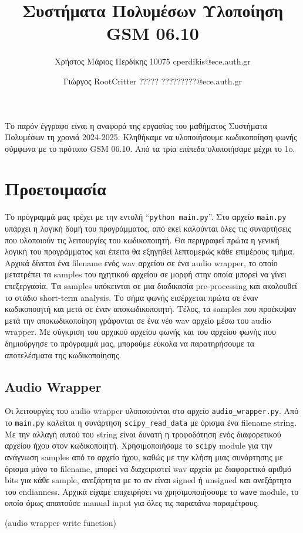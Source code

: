 \documentclass{article}
\title{Συστήματα Πολυμέσων Υλοποίηση GSM 06.10}
\author{Χρήστος Μάριος Περδίκης 10075 cperdikis@ece.auth.gr 
\and Γιώργος RootCritter ?????  ?????????@ece.auth.gr}
\date{}
\begin{document}
 \maketitle Το παρόν έγγραφο είναι η αναφορά της
εργασίας του μαθήματος Συστήματα Πολυμέσων τη χρονιά 2024-2025.
Κληθήκαμε να υλοποιήσουμε κωδικοποίηση φωνής σύμφωνα με το πρότυπο GSM
06.10. Από τα τρία επίπεδα υλοποιήσαμε μέχρι το 1o.

\section{Προετοιμασία}
Το πρόγραμμά μας τρέχει με την εντολή ``\verb|python main.py|''.
Στο αρχείο \verb|main.py| υπάρχει η λογική δομή του προγράμματος,
από εκεί καλούνται όλες τις συναρτήσεις που υλοποιούν τις λειτουργίες 
του κωδικοποιητή. Θα περιγραφεί πρώτα η γενική λογική του προγράμματος 
και έπειτα θα εξηγηθεί λεπτομερώς κάθε επιμέρους τμήμα. Αρχικά
δίνεται ένα filename ενός wav αρχείου σε ένα audio wrapper, το οποίο
μετατρέπει τα samples του ηχητικού αρχείου σε μορφή στην οποία
μπορεί να γίνει επεξεργασία.  Τα samples υπόκεινται σε μια
διαδικασία pre-processing και ακολουθεί το στάδιο 
short-term analysis. Το σήμα φωνής εισέρχεται πρώτα σε έναν κωδικοποιητή 
και μετά σε έναν αποκωδικοποιητή. Τέλος, τα samples που προέκυψαν μετά την
αποκωδικοποίηση γράφονται σε ένα νέο wav αρχείο μέσω του audio wrapper.
Με σύγκριση του αρχικού αρχείου φωνής και του αρχείου φωνής που 
δημιούργησε το πρόγραμμά μας, μπορούμε εύκολα να παρατηρήσουμε τα αποτελέσματα 
της κωδικοποίησης. 

\subsection{Audio Wrapper} 
Οι λειτουργίες του audio wrapper υλοποιούνται στο αρχείο 
\verb|audio_wrapper.py|. Από το \verb|main.py| καλείται η συνάρτηση 
\verb|scipy_read_data| με όρισμα ένα filename string. Με την αλλαγή 
αυτού του string είναι δυνατή η τροφοδότηση ενός διαφορετικού αρχείου
ήχου στον κωδικοποιητή. Χρησιμοποιήσαμε το \verb|scipy| module για την 
ανάγνωση samples από το αρχείο ήχου, καθώς με την κλήση μιας συνάρτησης με
όρισμα μόνο το filename, μπορεί να διαχειριστεί wav αρχεία με διαφορετικό
αριθμό bits για κάθε sample, ανεξάρτητα με το αν είναι signed ή unsigned
και ανεξάρτητα του endianness. Αρχικά είχαμε επιχειρήσει να χρησιμοποιήσουμε
το \verb|wave| module, το οποίο όμως απαιτούσε manual input για όλες τις 
παραπάνω παραμέτρους.

(audio wrapper write function)
\end{document}
